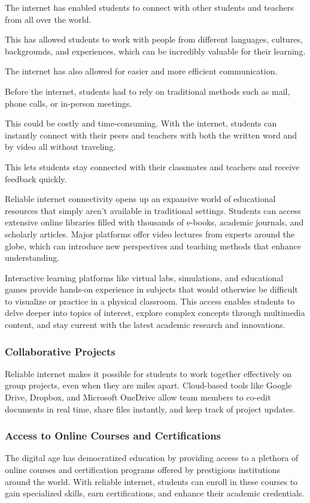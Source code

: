 \documentclass[a4paper,11pt]{article}
\begin{document}
The internet has enabled students to connect with other students and teachers from all over the world.

This has allowed students to work with people from different languages, cultures, backgrounds, and experiences, which can be incredibly valuable for their learning.

The internet has also allowed for easier and more efficient communication.

Before the internet, students had to rely on traditional methods such as mail, phone calls, or in-person meetings.

This could be costly and time-consuming. With the internet, students can instantly connect with their peers and teachers with both the written word and by video all without traveling.

This lets students stay connected with their classmates and teachers and receive feedback quickly.

Reliable internet connectivity opens up an expansive world of educational resources that simply aren’t available in traditional settings. Students can access extensive online libraries filled with thousands of e-books, academic journals, and scholarly articles. Major platforms offer video lectures from experts around the globe, which can introduce new perspectives and teaching methods that enhance understanding.

Interactive learning platforms like virtual labs, simulations, and educational games provide hands-on experience in subjects that would otherwise be difficult to visualize or practice in a physical classroom. This access enables students to delve deeper into topics of interest, explore complex concepts through multimedia content, and stay current with the latest academic research and innovations.

\subsubsection{Collaborative Projects}
Reliable internet makes it possible for students to work together effectively on group projects, even when they are miles apart. Cloud-based tools like Google Drive, Dropbox, and Microsoft OneDrive allow team members to co-edit documents in real time, share files instantly, and keep track of project updates.

\subsubsection{Access to Online Courses and Certifications}
The digital age has democratized education by providing access to a plethora of online courses and certification programs offered by prestigious institutions around the world. With reliable internet, students can enroll in these courses to gain specialized skills, earn certifications, and enhance their academic credentials.
\end{document}
